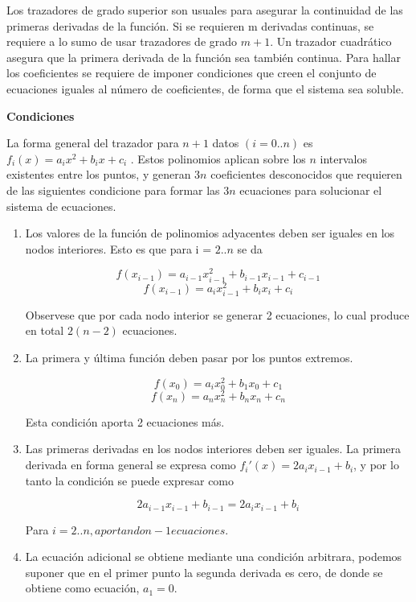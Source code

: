 \documentclass[letterpaper,10pt,oneside]{sphinxmanual}
\theoremstyle{plain}%
\theoremstyle{definition}%
\theoremstyle{remark}%
\begin{document}
Los trazadores de grado superior son usuales para asegurar la continuidad de
las primeras derivadas de la función. Si se requieren m derivadas continuas, se
requiere a lo sumo de usar trazadores de grado $m + 1$.
Un trazador cuadrático asegura que la primera derivada de la función sea también
continua.
Para hallar los coeficientes se requiere de imponer condiciones que creen el conjunto
de ecuaciones iguales al número de coeficientes, de forma que el sistema sea
soluble.

\textbf{Condiciones}

La forma general del trazador para $n + 1$ datos $(i = 0..n)$ es $f_i(x) = a_ix^
2 +
b_ix+c_i$
. Estos polinomios aplican sobre los $n$ intervalos existentes entre los puntos,
y generan $3n$ coeficientes desconocidos que requieren de las siguientes condicione
para formar las $3n$ ecuaciones para solucionar el sistema de ecuaciones.

\begin{enumerate}
	\item Los valores de la función de polinomios adyacentes deben ser iguales en los
	nodos interiores. Esto es que para i = $2..n$ se da
	
	\begin{equation}
		f(x_{i-1})=a_{i-1}x^2_{i-1}+b_{i-1}x_{i-1}+c_{i-1} 
	\end{equation}
	\begin{equation}
		f(x_{i-1})=a_ix^2_{i-1}+b_ix_i+c_i
	\end{equation}
	
	Observese que por cada nodo interior se generar 2 ecuaciones, lo cual produce en total $2(n-2)$ ecuaciones.
	
	\item La primera y última función deben pasar por los puntos extremos.
	
	\begin{equation}
	f(x_0)=a_ix^2_0+b_1x_0+c_1 
	\end{equation}
	\begin{equation}
	f(x_n)=a_nx^2_n+b_nx_n+c_n
	\end{equation}
	
	Esta condición aporta 2 ecuaciones más.
	
	\item Las primeras derivadas en los nodos interiores deben ser iguales. La primera derivada en forma general se expresa como $f_i'(x)=2a_ix_{i-1}+b_i$, y por lo tanto la condición se puede expresar como
	
	\begin{equation}
		2a_{i-1}x_{i-1}+b_{i-1}=2a_ix_{i-1}+b_i
	\end{equation}
	
	Para $i=2..n, aportando n-1 ecuaciones.$
	
	\item La ecuación adicional se obtiene mediante una condición arbitrara, podemos suponer que en el primer punto la segunda derivada es cero, de donde se obtiene como ecuación, $a_1=0$. 
	
\end{enumerate}
\end{document}

